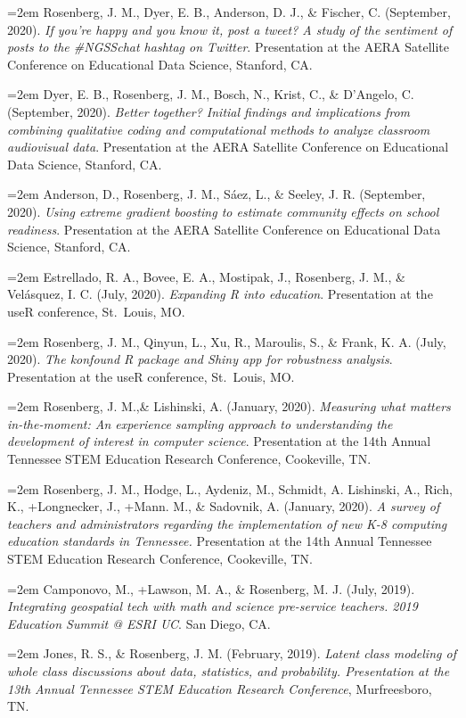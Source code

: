 \documentclass[
  14,
]{article}
\begin{document}
\hangindent=2em Rosenberg, J. M., Dyer, E. B., Anderson, D. J., \&
Fischer, C. (September, 2020). \emph{If you're happy and you know it,
post a tweet? A study of the sentiment of posts to the \#NGSSchat
hashtag on Twitter}. Presentation at the AERA Satellite Conference on
Educational Data Science, Stanford, CA.

\hangindent=2em Dyer, E. B., Rosenberg, J. M., Bosch, N., Krist, C., \&
D'Angelo, C. (September, 2020). \emph{Better together? Initial findings
and implications from combining qualitative coding and computational
methods to analyze classroom audiovisual data}. Presentation at the AERA
Satellite Conference on Educational Data Science, Stanford, CA.

\hangindent=2em Anderson, D., Rosenberg, J. M., Sáez, L., \& Seeley, J.
R. (September, 2020). \emph{Using extreme gradient boosting to estimate
community effects on school readiness}. Presentation at the AERA
Satellite Conference on Educational Data Science, Stanford, CA.

\hangindent=2em Estrellado, R. A., Bovee, E. A., Mostipak, J.,
Rosenberg, J. M., \& Velásquez, I. C. (July, 2020). \emph{Expanding R
into education}. Presentation at the useR conference, St.~Louis, MO.

\hangindent=2em Rosenberg, J. M., Qinyun, L., Xu, R., Maroulis, S., \&
Frank, K. A. (July, 2020). \emph{The konfound R package and Shiny app
for robustness analysis}. Presentation at the useR conference,
St.~Louis, MO.

\hangindent=2em Rosenberg, J. M.,\& Lishinski, A. (January, 2020).
\emph{Measuring what matters in-the-moment: An experience sampling
approach to understanding the development of interest in computer
science}. Presentation at the 14th Annual Tennessee STEM Education
Research Conference, Cookeville, TN.

\hangindent=2em Rosenberg, J. M., Hodge, L., Aydeniz, M., Schmidt, A.
Lishinski, A., Rich, K., +Longnecker, J., +Mann. M., \& Sadovnik, A.
(January, 2020). \emph{A survey of teachers and administrators regarding
the implementation of new K-8 computing education standards in
Tennessee.} Presentation at the 14th Annual Tennessee STEM Education
Research Conference, Cookeville, TN.

\hangindent=2em Camponovo, M., +Lawson, M. A., \& Rosenberg, M. J.
(July, 2019). \emph{Integrating geospatial tech with math and science
pre-service teachers. 2019 Education Summit @ ESRI UC}. San Diego, CA.

\hangindent=2em Jones, R. S., \& Rosenberg, J. M. (February, 2019).
\emph{Latent class modeling of whole class discussions about data,
statistics, and probability. Presentation at the 13th Annual Tennessee
STEM Education Research Conference}, Murfreesboro, TN.
\end{document}
